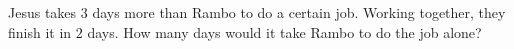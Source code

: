 Jesus takes $3$ days more than Rambo to do a certain job. Working together, they finish it in $2$ days. How many days would it take Rambo to do the job alone?

